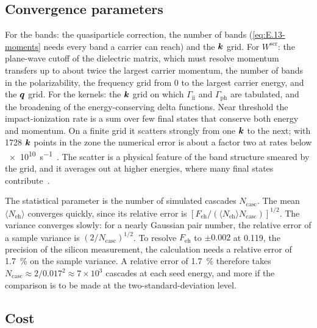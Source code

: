 \subsection{Convergence parameters}

For the bands: the quasiparticle correction, the number of bands (\cref{eq:E.13-moments} needs every band a carrier can reach) and the $\bm{k}$ grid. For $W^{\mathrm{scr}}$: the plane-wave cutoff of the dielectric matrix, which must resolve momentum transfers up to about twice the largest carrier momentum, the number of bands in the polarizability, the frequency grid from 0 to the largest carrier energy, and the $\bm{q}$ grid. For the kernels: the $\bm{k}$ grid on which $\varGamma_{\mathrm{ii}}$ and $\varGamma_{\mathrm{ph}}$ are tabulated, and the broadening of the energy-conserving delta functions. Near threshold the impact-ionization rate is a sum over few final states that conserve both energy and momentum. On a finite grid it scatters strongly from one $\bm{k}$ to the next; with 1728 $\bm{k}$ points in the zone the numerical error is about a factor two at rates below \SI{e10}{s^{-1}}~\cite[Fig.~2]{kotani2010impact}. The scatter is a physical feature of the band structure smeared by the grid, and it averages out at higher energies, where many final states contribute~\cite[Sect.~III]{kotani2010impact}.

The statistical parameter is the number of simulated cascades $N_{\mathrm{casc}}$. The mean $\langle N_{\mathrm{eh}}\rangle$ converges quickly, since its relative error is $[F_{\mathrm{eh}}/(\langle N_{\mathrm{eh}}\rangle N_{\mathrm{casc}})]^{1/2}$. The variance converges slowly: for a nearly Gaussian pair number, the relative error of a sample variance is $(2/N_{\mathrm{casc}})^{1/2}$. To resolve $F_{\mathrm{eh}}$ to $\pm0.002$ at 0.119, the precision of the silicon measurement, the calculation needs a relative error of \SI{1.7}{\percent} on the sample variance. A relative error of \SI{1.7}{\percent} therefore takes $N_{\mathrm{casc}} \approx 2/0.017^2 \approx 7\times10^3$ cascades at each seed energy, and more if the comparison is to be made at the two-standard-deviation level.

\subsection{Cost}

